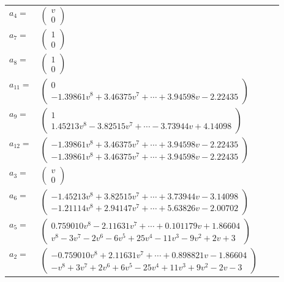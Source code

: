 \documentclass[1p]{elsarticle_modified}
\theoremstyle{definition}
\begin{document}
\begin{tabular}{m{7pt} m{180pt} m{7pt} m{180pt} }
\flushright $a_{4}=$&$\begin{pmatrix}v\\0\end{pmatrix}$ \\
\flushright $a_{7}=$&$\begin{pmatrix}1\\0\end{pmatrix}$ \\
\flushright $a_{8}=$&$\begin{pmatrix}1\\0\end{pmatrix}$ \\
\flushright $a_{11}=$&$\begin{pmatrix}0\\-1.39861 v^{8}+3.46375 v^{7}+\cdots+3.94598 v-2.22435\end{pmatrix}$ \\
\flushright $a_{9}=$&$\begin{pmatrix}1\\1.45213 v^{8}-3.82515 v^{7}+\cdots-3.73944 v+4.14098\end{pmatrix}$ \\
\flushright $a_{12}=$&$\begin{pmatrix}-1.39861 v^{8}+3.46375 v^{7}+\cdots+3.94598 v-2.22435\\-1.39861 v^{8}+3.46375 v^{7}+\cdots+3.94598 v-2.22435\end{pmatrix}$ \\
\flushright $a_{3}=$&$\begin{pmatrix}v\\0\end{pmatrix}$ \\
\flushright $a_{6}=$&$\begin{pmatrix}-1.45213 v^{8}+3.82515 v^{7}+\cdots+3.73944 v-3.14098\\-1.21114 v^{8}+2.94147 v^{7}+\cdots+5.63826 v-2.00702\end{pmatrix}$ \\
\flushright $a_{5}=$&$\begin{pmatrix}0.759010 v^{8}-2.11631 v^{7}+\cdots+0.101179 v+1.86604\\v^8-3 v^7-2 v^6-6 v^5+25 v^4-11 v^3-9 v^2+2 v+3\end{pmatrix}$ \\
\flushright $a_{2}=$&$\begin{pmatrix}-0.759010 v^{8}+2.11631 v^{7}+\cdots+0.898821 v-1.86604\\- v^8+3 v^7+2 v^6+6 v^5-25 v^4+11 v^3+9 v^2-2 v-3\end{pmatrix}$ \\

\end{tabular}
\end{document}
